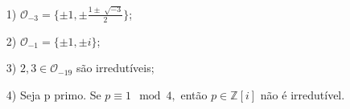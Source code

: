 \documentclass[algebraII_notes.tex]{subfiles}
\begin{document}
\begin{example}
	\begin{itemize}
		\item[1)] \(\mathcal{O}_{-3} = \{\pm1, \pm \frac{1\pm \sqrt[]{-3}}{2}\}\);
		\item[2)] \(\mathcal{O}_{-1} = \{\pm1, \pm i\}\);
		\item[3)] \(2, 3\in \mathcal{O}_{-19}\) são irredutíveis;
		\item[4)] Seja p primo. Se \(p\equiv 1 \mod 4,\) então \(p\in \mathbb{Z}[i]\) não é irredutível.
	\end{itemize}
\end{example}
\end{document}
